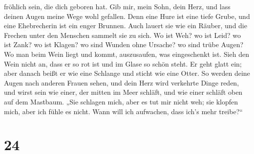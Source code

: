 fröhlich sein, die dich geboren hat.  Gib mir, mein Sohn,
dein Herz, und lass deinen Augen meine Wege wohl gefallen.
 Denn eine Hure ist eine tiefe Grube, und eine
Ehebrecherin ist ein enger Brunnen.  Auch lauert sie wie
ein Räuber, und die Frechen unter den Menschen sammelt sie zu sich.
 Wo ist Weh? wo ist Leid? wo ist Zank? wo ist Klagen? wo
sind Wunden ohne Ursache? wo sind trübe Augen?  Wo man
beim Wein liegt und kommt, auszusaufen, was eingeschenkt ist.
 Sieh den Wein nicht an, dass er so rot ist und im Glase
so schön steht. Er geht glatt ein;  aber danach beißt er
wie eine Schlange und sticht wie eine Otter.  So werden
deine Augen nach anderen Frauen sehen, und dein Herz wird verkehrte
Dinge reden,  und wirst sein wie einer, der mitten im
Meer schläft, und wie einer schläft oben auf dem Mastbaum.
 „Sie schlagen mich, aber es tut mir nicht weh; sie
klopfen mich, aber ich fühle es nicht. Wann will ich aufwachen, dass
ich's mehr treibe?{}``

\hypertarget{section-23}{%
\section{24}\label{section-23}}

